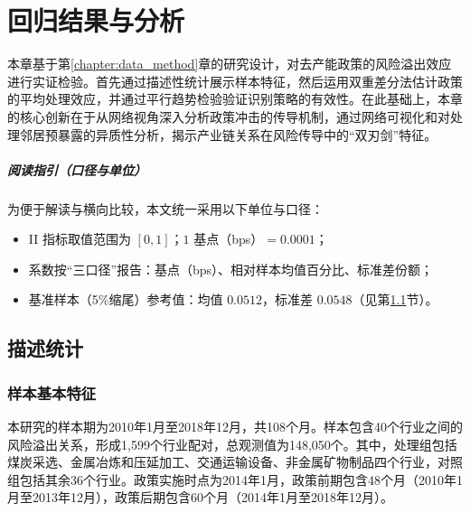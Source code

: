 \chapter{回归结果与分析}
\label{chap:empirical}



本章基于第\ref{chapter:data_method}章的研究设计，对去产能政策的风险溢出效应进行实证检验。首先通过描述性统计展示样本特征，然后运用双重差分法估计政策的平均处理效应，并通过平行趋势检验验证识别策略的有效性。在此基础上，本章的核心创新在于从网络视角深入分析政策冲击的传导机制，通过网络可视化和对处理邻居预暴露的异质性分析，揭示产业链关系在风险传导中的“双刃剑”特征。

\paragraph{阅读指引（口径与单位）}
为便于解读与横向比较，本文统一采用以下单位与口径：
\begin{itemize}
  \item II 指标取值范围为 $[0,1]$；$1$ 基点（bps）$=0.0001$；
  \item 系数按“三口径”报告：基点（bps）、相对样本均值百分比、标准差份额；
  \item 基准样本（5\%缩尾）参考值：均值 $0.0512$，标准差 $0.0548$（见第\ref{sec:descriptive}节）。
\end{itemize}



\section{描述统计}
\label{sec:descriptive}

\subsection{样本基本特征}

本研究的样本期为2010年1月至2018年12月，共108个月。样本包含40个行业之间的风险溢出关系，形成1,599个行业配对，总观测值为148,050个。其中，处理组包括煤炭采选、金属冶炼和压延加工、交通运输设备、非金属矿物制品四个行业，对照组包括其余36个行业。政策实施时点为2014年1月，政策前期包含48个月（2010年1月至2013年12月），政策后期包含60个月（2014年1月至2018年12月）。

